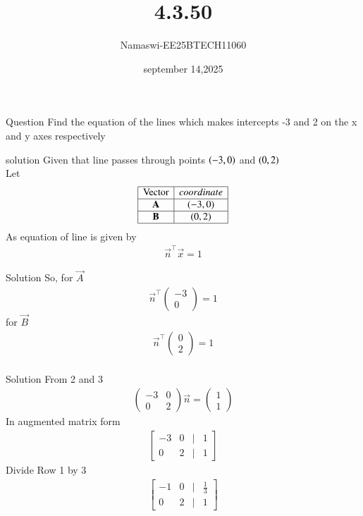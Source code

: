 \documentclass{beamer}
\begin{document}
\title 
{4.3.50}
\date{september 14,2025}


\author 
{Namaswi-EE25BTECH11060}
\frame{\titlepage}
\begin{frame}{Question}
Find the equation of the lines which makes intercepts -3 and 2 on the x and y axes respectively
\end{frame}
\begin{frame}{solution}
Given that line passes through points $\brak{-3,0}$ and $\brak{0,2}$ \\
Let
\[
\begin{array}{|c|c|}
\hline
\text{Vector} & coordinate \\ \hline
\vec{A} & (-3, 0) \\ \hline
\vec{B} & (0, 2) \\ \hline
\end{array}
\]
As equation of line is given by 
\begin{align}
    \vec{n}^\top \vec{x}=1
\end{align}
\end{frame}
\begin{frame}{Solution}
   So, for $\vec{A}$
 \begin{align}
  \vec{n}^\top\begin{pmatrix}
     -3  \\ 0
 \end{pmatrix}=1
  \end{align}
  for $\vec{B}$
 \begin{align}
  \vec{n}^\top\begin{pmatrix}
     0  \\  2
 \end{pmatrix}=1\\ 
\end{align}
\end{frame}
\begin{frame}{Solution}
    From 2 and 3\\
    \begin{align}
    \begin{pmatrix}
     -3 & 0 \\
     0 & 2 
 \end{pmatrix} \vec{n}=\begin{pmatrix}
     1 \\ 1
 \end{pmatrix}
    \end{align}
In augmented matrix form\\
\begin{align}
\begin{bmatrix}
-3 & 0 & \big| & 1 \\
0 & 2 & \big| & 1
\end{bmatrix}
\end{align}
Divide Row 1 by 3
\begin{align}
\begin{bmatrix}
-1 & 0 & \big| & \frac{1}{3}\\
0 &  2  & \big| & 1
\end{bmatrix}
\end{align}
\end{frame}
\end{document}
